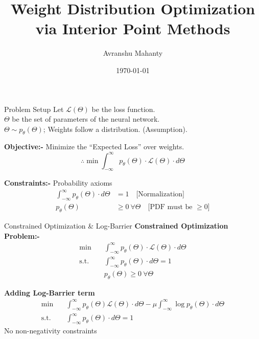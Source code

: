 \documentclass{beamer}
\title{Weight Distribution Optimization via Interior Point Methods}
\author{Avranshu Mahanty}
\institute{University of Cincinnati}
\date{\today}
\begin{document}
\begin{frame}
    \titlepage
\end{frame}

\begin{frame}{Problem Setup}
    Let $\mathcal{L}(\Theta)$ be the loss function.\\
    $\Theta$ be the set of parameters of the neural network.\\
    $\Theta \sim p_{\theta}(\Theta)$; Weights follow a distribution. (Assumption).
    
    \vspace{0.5cm}
    \textbf{Objective:-} Minimize the ``Expected Loss'' over weights.
    \[
        \therefore \min \int_{-\infty}^{\infty} p_{\theta}(\Theta) \cdot \mathcal{L}(\Theta) \cdot d\Theta
    \]
    
    \vspace{0.5cm}
    \textbf{Constraints:-} Probability axioms
    \begin{align*}
        \int_{-\infty}^{\infty} p_{\theta}(\Theta) \cdot d\Theta &= 1 \quad \text{[Normalization]} \\
        p_{\theta}(\Theta) &\geq 0 \ \forall \Theta \quad \text{[PDF must be } \geq 0\text{]}
    \end{align*}
\end{frame}

\begin{frame}{Constrained Optimization \& Log-Barrier}
    \textbf{Constrained Optimization Problem:-}
    \begin{align*}
        \min \quad & \int_{-\infty}^{\infty} p_{\theta}(\Theta) \cdot \mathcal{L}(\Theta) \cdot d\Theta \\
        \text{s.t.} \quad & \int_{-\infty}^{\infty} p_{\theta}(\Theta) \cdot d\Theta = 1 \\
        & p_{\theta}(\Theta) \geq 0 \ \forall \Theta
    \end{align*}
    
    \vspace{0.5cm}
    \textbf{Adding Log-Barrier term}
    \begin{align*}
        \min \quad & \int_{-\infty}^{\infty} p_{\theta}(\Theta)\mathcal{L}(\Theta) \cdot d\Theta - \mu \int_{-\infty}^{\infty} \log p_{\theta}(\Theta) \cdot d\Theta \\
        \text{s.t.} \quad & \int_{-\infty}^{\infty} p_{\theta}(\Theta) \cdot d\Theta = 1
    \end{align*}
    No non-negativity constraints
\end{frame}
\end{document}
